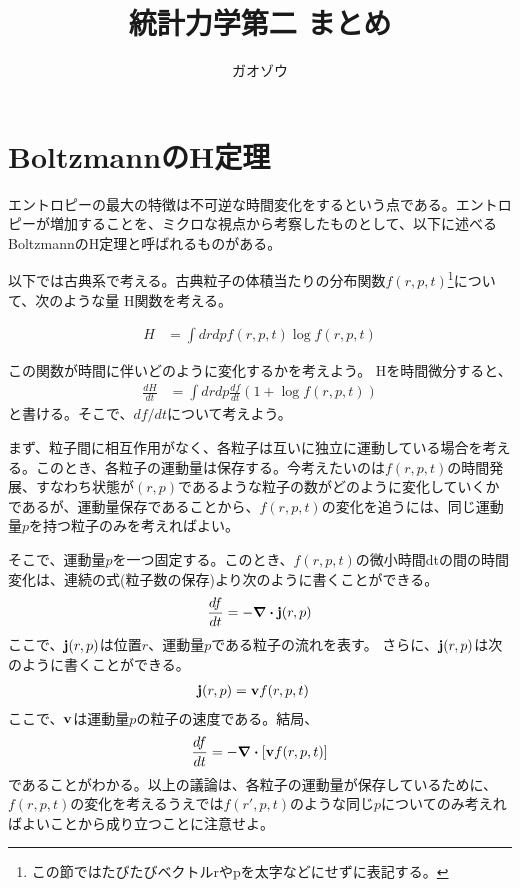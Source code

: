 \documentclass[uplatex,dvipdfmx]{jsarticle}
\title{統計力学第二 まとめ}
\author{ガオゾウ}
\begin{document}
\maketitle
\section{BoltzmannのH定理}
エントロピーの最大の特徴は不可逆な時間変化をするという点である。エントロピーが増加することを、ミクロな視点から考察したものとして、以下に述べるBoltzmannのH定理と呼ばれるものがある。

以下では古典系で考える。古典粒子の体積当たりの分布関数$f(r,p,t)$\footnote{この節ではたびたびベクトルrやpを太字などにせずに表記する。}について、次のような量 H関数を考える。

\begin{align}
    H &= \int drdp f(r,p,t) \log f(r,p,t)
\end{align}

この関数が時間に伴いどのように変化するかを考えよう。
Hを時間微分すると、
\begin{align}
    \frac{dH}{dt} &= \int drdp \frac{df}{dt}(1+\log f(r,p,t)) \label{eq:dHdt}
\end{align}
と書ける。そこで、$df/dt$について考えよう。

まず、粒子間に相互作用がなく、各粒子は互いに独立に運動している場合を考える。このとき、各粒子の運動量は保存する。今考えたいのは$f(r,p,t)$の時間発展、すなわち状態が$(r,p)$であるような粒子の数がどのように変化していくかであるが、運動量保存であることから、$f(r,p,t)$の変化を追うには、同じ運動量$p$を持つ粒子のみを考えればよい。

そこで、運動量$p$を一つ固定する。このとき、$f(r,p,t)$の微小時間dtの間の時間変化は、連続の式(粒子数の保存)より次のように書くことができる。
\begin{align}
    \frac{df}{dt} = - \div \vb{j}(r,p) 
\end{align}
ここで、$\vb{j}(r,p)$は位置$r$、運動量$p$である粒子の流れを表す。
さらに、$\vb{j}(r,p)$は次のように書くことができる。
\begin{align}
    \vb{j}(r,p) &= \vb{v} f(r,p,t)
\end{align}
ここで、$\vb{v}$は運動量$p$の粒子の速度である。結局、
\begin{align}
    \frac{df}{dt} = - \div [\vb{v}f(r,p,t)] \label{eq:dfdt_no_int}
\end{align}
であることがわかる。以上の議論は、各粒子の運動量が保存しているために、$f(r,p,t)$の変化を考えるうえでは$f(r',p,t)$のような同じ$p$についてのみ考えればよいことから成り立つことに注意せよ。
\end{document}

